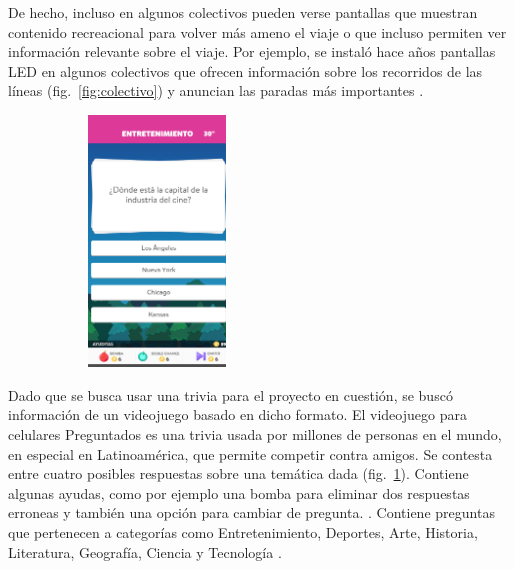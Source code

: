 \documentclass{article}
\begin{document}
De hecho, incluso en algunos colectivos pueden verse pantallas que muestran contenido recreacional para volver más ameno el viaje o que incluso permiten ver información relevante sobre el viaje. Por ejemplo, se instaló hace años pantallas LED en algunos colectivos que ofrecen información sobre los recorridos de las líneas (fig.~\ref{fig:colectivo}) y anuncian las paradas más importantes \parencite{lacapitalColectivos}.
\begin{figure}[H]
	\caption{Preguntados}
    \begin{subfigure}{1.0\textwidth}
	\includegraphics[width=0.4\textwidth]{preguntados.png}
    \end{subfigure}
	\label{fig:preguntados}
\end{figure}
\vspace{-1.0\baselineskip}
Dado que se busca usar una trivia para el proyecto en cuestión, se buscó información de un videojuego basado en dicho formato. El videojuego para celulares Preguntados es una trivia usada por millones de personas en el mundo, en especial en Latinoamérica, que permite competir contra amigos. Se contesta entre cuatro posibles respuestas sobre una temática dada (fig.~\ref{fig:preguntados}). Contiene algunas ayudas, como por ejemplo una bomba para eliminar dos respuestas erroneas y también una opción para cambiar de pregunta. \parencite{minutouno}. Contiene preguntas que pertenecen a categorías como Entretenimiento, Deportes, Arte, Historia, Literatura, Geografía, Ciencia y Tecnología \parencite{abcPreguntados}.
\end{document}
